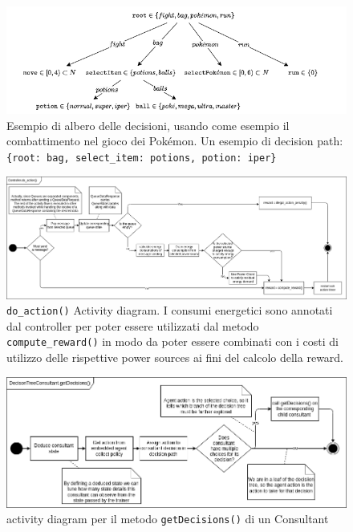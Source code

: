\documentclass[conference]{IEEEtran}
\newcommand{\code}[1]{\texttt{#1}}
\begin{document}
\begin{figure}
    \centering
    \includegraphics[width=\textwidth]{figs/decisions.drawio.png}
    \caption{Esempio di albero delle decisioni, usando come esempio il combattimento
    nel gioco dei Pokémon. Un esempio di decision path:\\
    \code{\{root: bag, select\_item: potions, potion: iper\}}}
    \label{fig:decisions}
\end{figure}
\begin{figure}
    \centering
    \includegraphics[width=\textwidth]{figs/controller_doAction_activity_diagram.drawio.png}
    \caption{\code{do\_action()} Activity diagram. I consumi energetici sono annotati dal controller per poter essere utilizzati dal metodo \code{compute\_reward()} in modo da poter essere combinati con i costi di utilizzo delle rispettive power sources ai fini del calcolo della reward.}
    \label{fig:controller_doAction_activity_diagram}
\end{figure}
\begin{figure}
    \centering
    \includegraphics[width=\textwidth]{figs/decisions_getDecisions_activity_diagram.drawio.png}
    \caption{activity diagram per il metodo \code{getDecisions()} di un Consultant}
    \label{fig:decisions_getDecisions_activity_diagram}
\end{figure}
\end{document}
